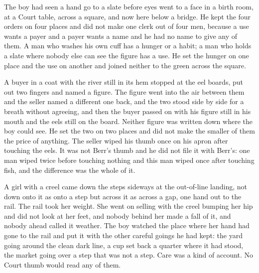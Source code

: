 The boy had seen a hand go to a slate before eyes went to a face in a birth room, at a Court table, across a square, and now here below a bridge. He kept the four orders on four places and did not make one clerk out of four men, because a use wants a payer and a payer wants a name and he had no name to give any of them. A man who washes his own cuff has a hunger or a habit; a man who holds a slate where nobody else can see the figure has a use. He set the hunger on one place and the use on another and joined neither to the green across the square.

A buyer in a coat with the river still in its hem stopped at the eel boards, put out two fingers and named a figure. The figure went into the air between them and the seller named a different one back, and the two stood side by side for a breath without agreeing, and then the buyer passed on with his figure still in his mouth and the eels still on the board. Neither figure was written down where the boy could see. He set the two on two places and did not make the smaller of them the price of anything. The seller wiped his thumb once on his apron after touching the eels. It was not Berr's thumb and he did not file it with Berr's: one man wiped twice before touching nothing and this man wiped once after touching fish, and the difference was the whole of it.

A girl with a creel came down the steps sideways at the out-of-line landing, not down onto it as onto a step but across it as across a gap, one hand out to the rail. The rail took her weight. She went on selling with the creel bumping her hip and did not look at her feet, and nobody behind her made a fall of it, and nobody ahead called it weather. The boy watched the place where her hand had gone to the rail and put it with the other careful goings he had kept: the yard going around the clean dark line, a cup set back a quarter where it had stood, the market going over a step that was not a step. Care was a kind of account. No Court thumb would read any of them.

\scenebreak


